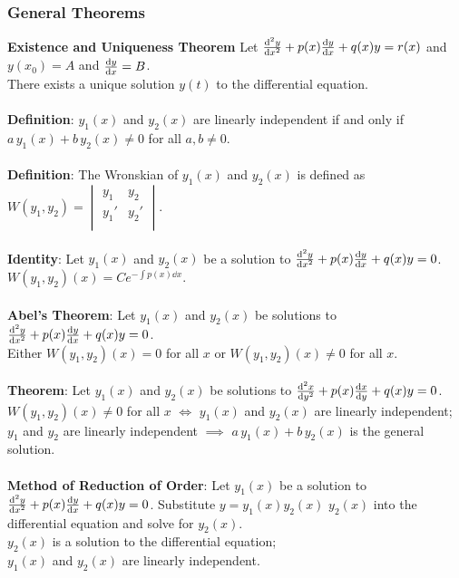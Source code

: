 \documentclass{article}
\begin{document}
			\subsubsection{General Theorems}
				\textbf{Existence and Uniqueness Theorem} Let $\dv[2]{y}{x} + p(x)\dv{y}{x} + q(x)y = r(x)$ and $y(x_0) = A$ and $\dv{y}{x}(x_0) = B$. \\
				There exists a unique solution $y(t)$ to the differential equation. \\
				\\
				\textbf{Definition}: $y_1(x)$ and $y_2(x)$ are linearly independent if and only if \\
				$a \, y_1(x) + b \, y_2(x) \ne 0$ \quad for all $a,b \ne 0$. \\
				\\
				\textbf{Definition}: The Wronskian of $y_1(x)$ and $y_2(x)$ is defined as \\
				$W(y_1,y_2) =	\begin{vmatrix}
									 y_1		& y_2 \\
									 y_1'	& y_2' \\
				\end{vmatrix}$. \\
				\\
				\textbf{Identity}: Let $y_1(x)$ and $y_2(x)$ be a solution to $\dv[2]{y}{x} + p(x)\dv{y}{x} + q(x)y = 0$. \\
				$W(y_1,y_2)(x) = Ce^{-\int{p(x)}\dd{x}}$. \\
				\\
				\textbf{Abel's Theorem}: Let $y_1(x)$ and $y_2(x)$ be solutions to $\dv[2]{y}{x} + p(x)\dv{y}{x} + q(x)y = 0$. \\
				Either $W(y_1,y_2)(x) = 0$ for all $x$ or $W(y_1,y_2)(x) \ne 0$ for all $x$. \\
				\\
				\textbf{Theorem}: Let $y_1(x)$ and $y_2(x)$ be solutions to $\dv[2]{x}{y} + p(x)\dv{x}{y} + q(x)y = 0$. \\
				\textbullet \; $W(y_1,y_2)(x) \ne 0$ for all $x$ $\iff$ $y_1(x)$ and $y_2(x)$ are linearly independent; \\
				\textbullet \; $y_1$ and $y_2$ are linearly independent $\implies$ $a \, y_1(x) + b \, y_2(x)$ is the general solution. \\
				\\
				\textbf{Method of Reduction of Order}: Let $y_1(x)$ be a solution to $\dv[2]{y}{x} + p(x)\dv{y}{x} + q(x)y = 0$. Substitute $y = y_1(x)y_2(x)$ $y_2(x)$ into the differential equation and solve for $y_2(x)$. \\
				\textbullet \; $y_2(x)$ is a solution to the differential equation; \\
				\textbullet \; $y_1(x)$ and $y_2(x)$ are linearly independent. \\
\end{document}
